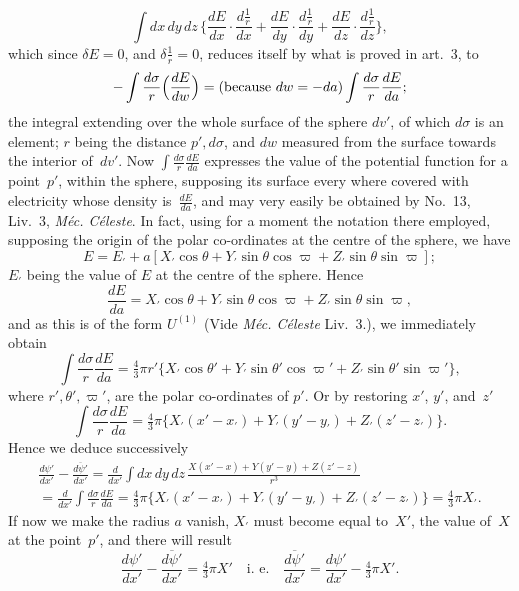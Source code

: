 \documentclass[11pt,notitlepage]{amsart}
\let\Title\textit
\begin{document}
\[
\int dx\,dy\,dz\,\biggl\{
  \frac{dE}{dx}\cdot\frac{d\frac1r}{dx}
  +\frac{dE}{dy}\cdot\frac{d\frac1r}{dy}
  +\frac{dE}{dz}\cdot\frac{d\frac1r}{dz}
\biggr\},
\]
which since $\delta E=0$, and $\delta\frac1r=0$,
reduces itself by what is proved in art.~3, to
\[
-\int\frac{d\sigma}{r}\Bigl(\frac{dE}{dw}\Bigr)
=\text{(because $dw=-da$)}
\int\frac{d\sigma}{r}\frac{dE}{da};
\]
the integral extending over the whole surface of the sphere $dv'$,
of which $d\sigma$
is an element; $r$ being the distance $p',d\sigma$,
and $dw$ measured from the surface
towards the interior of~$dv'$.
Now $\int\frac{d\sigma}{r}\frac{dE}{da}$ expresses the value of the potential
function for a point~$p'$, within the sphere, supposing its surface every where
covered with electricity whose density is~$\frac{dE}{da}$,
and may very easily be obtained
by No.~13, Liv.~3, \Title{M\'ec. C\'eleste}.
In fact, using for a moment the notation
there employed, supposing the origin of the polar co-ordinates at the centre
of the sphere, we have
\[
E=E_\prime+a[X_\prime\cos\theta
+Y_\prime\sin\theta\cos\varpi
+Z_\prime\sin\theta\sin\varpi];
\]
$E_\prime$ being the value of $E$ at the centre of the sphere. Hence
\[
\frac{dE}{da}=
X_\prime\cos\theta
+Y_\prime\sin\theta\cos\varpi
+Z_\prime\sin\theta\sin\varpi,
\]
and as this is of the form $U^{(1)}$ (Vide \Title{M\'ec. C\'eleste} Liv.~3.),
we immediately obtain
\[
\int\frac{d\sigma}{r}\frac{dE}{da}=\tfrac43\pi r'\{
X_\prime\cos\theta'
+Y_\prime\sin\theta'\cos\varpi'
+Z_\prime\sin\theta'\sin\varpi'\},
\]
where $r',\theta',\varpi'$, are the polar co-ordinates of $p'$.
Or by restoring $x'$, $y'$, and~$z'$
\[
\int\frac{d\sigma}{r}\frac{dE}{da}=\tfrac43\pi \bigl\{
  X_\prime(x'-x_\prime)
  +Y_\prime(y'-y_\prime)
  +Z_\prime(z'-z_\prime)\bigl\}.
\]
Hence we deduce successively
\begin{multline*}
\frac{{d\psi'}}{dx'}-\frac{\overline{d\psi'}}{dx'}
=\frac{d}{dx'}\int dx\,dy\,dz\,\frac{X(x'-x)+Y(y'-y)+Z(z'-z)}{r^3}\\
=\frac{d}{dx'}\int\frac{d\sigma}{r}\frac{dE}{da}
=\tfrac43\pi \bigl\{
  X_\prime(x'-x_\prime)
  +Y_\prime(y'-y_\prime)
  +Z_\prime(z'-z_\prime)\bigl\}
=\tfrac43\pi X_\prime.
\end{multline*}
If now we make the radius $a$ vanish,
$X_\prime$ must become equal to~$X'$, the value
of~$X$ at the point~$p'$, and there will result
\[
\frac{{d\psi'}}{dx'}-\frac{\overline{d\psi'}}{dx'}=\tfrac43\pi X'
\quad\text{i.~e.}\quad
\frac{\overline{d\psi'}}{dx'}=\frac{{d\psi'}}{dx'}-\tfrac43\pi X'.
\]
\end{document}
